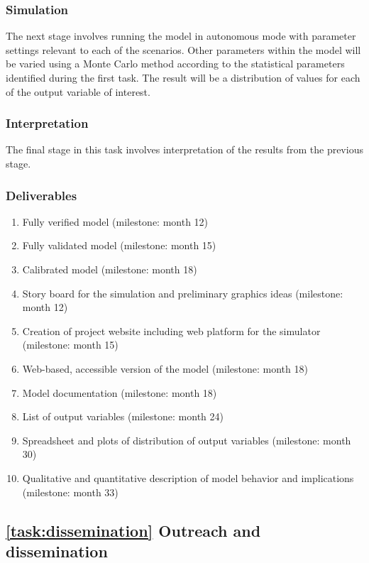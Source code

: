 \documentclass[11pt,a4paper]{article}
\begin{document}
\subsubsection{Simulation}

The next stage involves running the model in autonomous mode
with parameter settings relevant to each of the scenarios. 
Other parameters within the model will be varied 
using a Monte Carlo method according to 
the statistical parameters identified during the first task. 
The result will be a distribution of values for each of 
the output variable of interest.

\subsubsection{Interpretation}

The final stage in this task involves 
interpretation of the results from the previous stage. 

\subsubsection{Deliverables}
\begin{enumerate}
\vspace{-9pt}
\setlength{\itemsep}{-3pt}
\setcounter{enumi}{7}
	\item	Fully verified model (milestone: month 12)
	\item	Fully validated model (milestone: month 15)
	\item	Calibrated model (milestone: month 18)
	\item	Story board for the simulation and preliminary graphics ideas (milestone: month 12)
	\item	Creation of project website including web platform for the simulator (milestone: month 15)
	\item 	Web-based, accessible version of the model (milestone: month 18)
	\item 	Model documentation (milestone: month 18) 
	\item	List of output variables (milestone: month 24)
	\item	Spreadsheet and plots of distribution of output variables (milestone: month 30)
	\item	Qualitative and quantitative description of 
				model behavior and implications (milestone: month 33)
\end{enumerate}

\subsection{\ref{task:dissemination} Outreach and dissemination}
\label{sec:task:dissemination}
\end{document}
